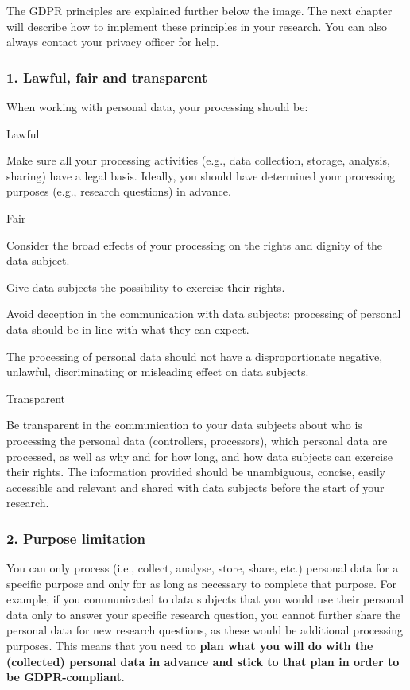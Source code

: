 \documentclass[
]{book}
\begin{document}
The GDPR principles are explained further below the image. The
next chapter will describe how to implement these
principles in your research. You can also always contact your
privacy officer for help.

\hypertarget{lawful-fair-and-transparent}{%
\subsubsection{1. Lawful, fair and transparent}\label{lawful-fair-and-transparent}}

When working with personal data, your processing should be:

Lawful

Make sure all your processing activities (e.g., data collection, storage,
analysis, sharing) have a legal basis. Ideally,
you should have determined your processing purposes (e.g., research questions)
in advance.

Fair

Consider the broad effects of your processing on the rights and dignity of the data subject.

Give data subjects the possibility to exercise their rights.

Avoid deception in the communication with data subjects: processing of personal data should be in line with what they can expect.

The processing of personal data should not have a disproportionate negative, unlawful, discriminating or misleading effect on data subjects.

Transparent

Be transparent in the communication to your data subjects
about who is processing the personal data (controllers, processors), which
personal data are processed, as well as why and for how long, and how data
subjects can exercise their rights. The information provided should be
unambiguous, concise, easily accessible and relevant and shared with data
subjects before the start of your research.

\hypertarget{purpose-limitation}{%
\subsubsection{2. Purpose limitation}\label{purpose-limitation}}

You can only process (i.e., collect, analyse, store, share, etc.) personal data
for a specific purpose and only for as long as necessary to complete that purpose.
For example, if you communicated to data subjects that you would use their
personal data only to answer your specific research question, you cannot further
share the personal data for new research questions, as these would be additional
processing purposes. This means that you need to \textbf{plan what you will do with
the (collected) personal data in advance and stick to that plan in order to be
GDPR-compliant}.
\end{document}

